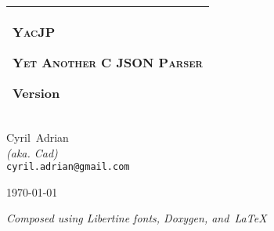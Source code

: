 \documentclass[a4paper,twoside,10pt]{book}
\providecommand{\clearemptydoublepage} %
   {\newpage \thispagestyle{empty} \cleardoublepage}
\begin{document}
\hypersetup{pageanchor=false,citecolor=blue}
\begin{titlepage}
  \vspace*{3cm}
  \begin{center}
    \begin{tabular}{p{10cm}}
      \hline
      \begin{minipage}[t]{10cm}
        \begin{center}
          \vspace*{2ex}
          {\Huge\textsc{YacJP}}

          \vspace*{1ex}
          {\Large\textsc{Yet Another C JSON Parser}}

          \vspace*{1ex}
          Version 
        \end{center}
      \end{minipage}
      \vspace{1ex}\\
      \hline
    \end{tabular}

    \vspace*{8em}
    {Cyril~{\sc Adrian} \\ {\footnotesize\em (aka. Cad)} \\ \texttt{cyril.adrian@gmail.com}}

    \vspace*{2cm}
    \today

    \vfill
    \emph{\small Composed using Libertine fonts, Doxygen, and~\LaTeX~}
  \end{center}
\end{titlepage}
\clearemptydoublepage
{}
\tableofcontents
\clearemptydoublepage
{}
\hypersetup{pageanchor=true,citecolor=blue}
\newcommand{\+}{\discretionary{\mbox{\scriptsize$\hookleftarrow$}}{}{}}
\end{document}
